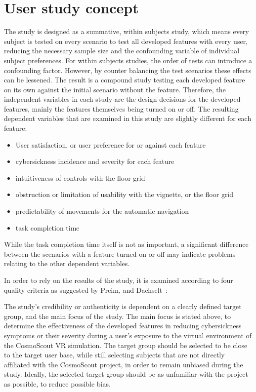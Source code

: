 \section{User study concept}\label{sec:user-study-concept}

The study is designed as a summative, within subjects study, which means every subject is tested on every scenario to
test all developed features with every user, reducing the necessary sample size and the confounding variable of
individual subject preferences.
For within subjects studies, the order of tests can introduce a confounding factor.
However, by counter balancing the test scenarios these effects can be lessened.
The result is a compound study testing each developed feature on its own against the initial scenario without the
feature.
Therefore, the independent variables in each study are the design decisions for the developed features, mainly the
features themselves being turned on or off.
The resulting dependent variables that are examined in this study are slightly different for each feature:
\begin{itemize}
    \item User satisfaction, or user preference for or against each feature
    \item cybersickness incidence and severity for each feature
    \item intuitiveness of controls with the floor grid
    \item obstruction or limitation of usability with the vignette, or the floor grid
    \item predictability of movements for the automatic navigation
    \item task completion time
\end{itemize}
While the task completion time itself is not as important, a significant difference between the scenarios with a
feature turned on or off may indicate problems relating to the other dependent variables.

In order to rely on the results of the study, it is examined according to four quality criteria as suggested
by Preim, and Dachselt~\cite{Preim2015}:

The study's credibility or authenticity is dependent on a clearly defined target group, and the main focus of the study.
The main focus is stated above, to determine the effectiveness of the developed features in reducing cybersickness
symptoms or their severity during a user's exposure to the virtual environment of the CosmoScout VR
simulation.
The target group should be selected to be close to the target user base, while still selecting subjects that are not
directly affiliated with the CosmoScout project, in order to remain unbiased during the study.
Ideally, the selected target group should be as unfamiliar with the project as possible, to reduce possible bias.

